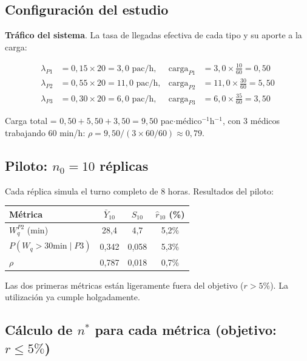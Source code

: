 \documentclass[11pt, letterpaper]{article}
\begin{document}
\subsection{Configuración del estudio}

\textbf{Tráfico del sistema}. La tasa de llegadas efectiva de cada tipo y su aporte a la carga:

\begin{align*}
\lambda_{P1} &= 0{,}15 \times 20 = 3{,}0 \text{ pac/h}, & \text{carga}_{P1} &= 3{,}0 \times \tfrac{10}{60} = 0{,}50 \\
\lambda_{P2} &= 0{,}55 \times 20 = 11{,}0 \text{ pac/h}, & \text{carga}_{P2} &= 11{,}0 \times \tfrac{30}{60} = 5{,}50 \\
\lambda_{P3} &= 0{,}30 \times 20 = 6{,}0 \text{ pac/h}, & \text{carga}_{P3} &= 6{,}0 \times \tfrac{35}{60} = 3{,}50
\end{align*}

Carga total = $0{,}50 + 5{,}50 + 3{,}50 = 9{,}50$ pac$\cdot$médico$^{-1}$h$^{-1}$, con 3 médicos trabajando 60 min/h: $\rho = 9{,}50/(3 \times 60/60) \approx 0{,}79$.

\subsection{Piloto: $n_0 = 10$ réplicas}

Cada réplica simula el turno completo de 8 horas. Resultados del piloto:

\begin{center}\small
\renewcommand{\arraystretch}{1.3}
\begin{tabular}{lccc}
\toprule
\textbf{Métrica} & $\bar Y_{10}$ & $S_{10}$ & $\hat r_{10}$ (\%) \\
\midrule
$W_q^{P2}$ (min)           & 28{,}4 & 4{,}7  & 5{,}2\% \\
$P(W_q>30\text{min}\mid P3)$ & 0{,}342 & 0{,}058 & 5{,}3\% \\
$\rho$                     & 0{,}787 & 0{,}018 & 0{,}7\% \\
\bottomrule
\end{tabular}
\end{center}

Las dos primeras métricas están ligeramente fuera del objetivo ($r > 5\%$). La utilización ya cumple holgadamente.

\subsection{Cálculo de $n^*$ para cada métrica (objetivo: $r \le 5\%$)}
\end{document}
